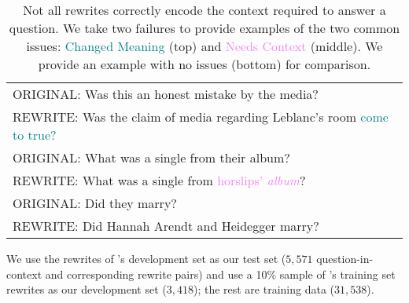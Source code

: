 \begin{table}[t]
    \begin{centering}
    \begin{tabular}{p{7cm}}
      \toprule
		ORIGINAL: Was this an honest mistake by the media? \\
                REWRITE: Was the claim of media regarding Leblanc's room \textcolor{teal}{come to true?}\\
		ORIGINAL: What was a single from their album? \\
		 REWRITE: What was a single from \textcolor{violet}{horslips' \textit{album}}?  \\
          ORIGINAL: Did they marry?  \\
           REWRITE:   Did Hannah Arendt and Heidegger marry? \\
		 \bottomrule
	\end{tabular}
        \end{centering}
        \caption{Not all rewrites correctly encode the context
          required to answer a question.  We take two failures to
          provide examples of the two common issues:
          \textcolor{teal}{Changed Meaning} (top) and
          \textcolor{violet}{Needs Context} (middle).  We provide an
          example with no issues (bottom) for comparison. }
	\label{tab:rewriteexamples}
\end{table}

We use the rewrites of \abr{\quac}'s development set as our test set
($5{,}571$ question-in-context and corresponding rewrite pairs) and use
a 10\% sample of \abr{\quac}'s training set rewrites as our
development set ($3{,}418$); the rest are training data ($31{,}538$).
